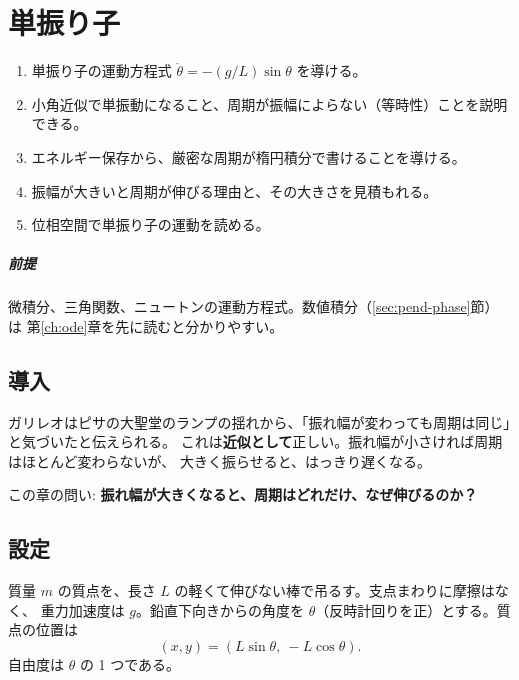 \chapter{単振り子}\label{ch:pendulum}

\begin{objectives}
\begin{enumerate}
  \item 単振り子の運動方程式 $\ddot\theta=-(g/L)\sin\theta$ を導ける。
  \item 小角近似で単振動になること、周期が振幅によらない（等時性）ことを説明できる。
  \item エネルギー保存から、厳密な周期が楕円積分で書けることを導ける。
  \item 振幅が大きいと周期が伸びる理由と、その大きさを見積もれる。
  \item 位相空間で単振り子の運動を読める。
\end{enumerate}
\end{objectives}

\paragraph{前提}
微積分、三角関数、ニュートンの運動方程式。数値積分（\ref{sec:pend-phase}節）は
第\ref{ch:ode}章を先に読むと分かりやすい。

\section{導入}\label{sec:pend-intro}

ガリレオはピサの大聖堂のランプの揺れから、「振れ幅が変わっても周期は同じ」と気づいたと伝えられる。
これは\textbf{近似として}正しい。振れ幅が小さければ周期はほとんど変わらないが、
大きく振らせると、はっきり遅くなる。

\begin{intuition}
この章の問い: \textbf{振れ幅が大きくなると、周期はどれだけ、なぜ伸びるのか？}
\end{intuition}

\section{設定}\label{sec:pend-setup}

質量 $m$ の質点を、長さ $L$ の軽くて伸びない棒で吊るす。支点まわりに摩擦はなく、
重力加速度は $g$。鉛直下向きからの角度を $\theta$（反時計回りを正）とする。質点の位置は
\begin{equation}
  (x,y)=(L\sin\theta,\ -L\cos\theta).
\end{equation}
自由度は $\theta$ の 1 つである。

